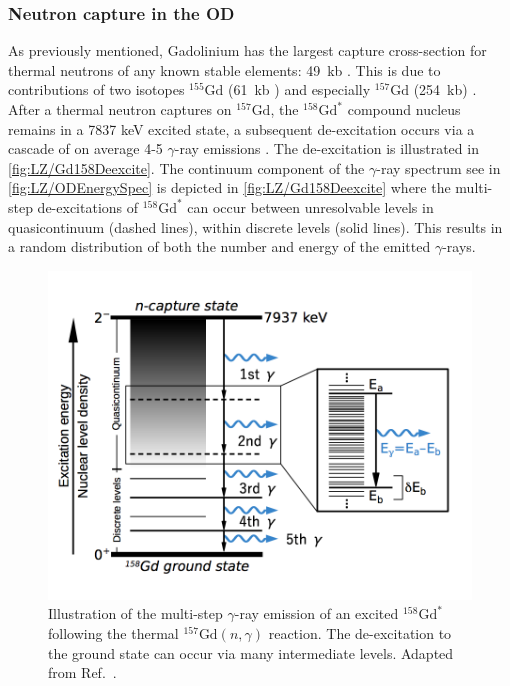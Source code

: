 \subsubsection{Neutron capture in the OD}\label{sec:LZ/NeutronCapture}
As previously mentioned, Gadolinium has the largest capture cross-section for thermal neutrons of any known stable elements: 49~kb \cite{Hagiwara:2018kmr}. This is due to contributions of two isotopes $^{155}\text{Gd}$ (61~kb ) and especially $^{157}\text{Gd}$ (254~kb) \cite{Hagiwara:2018kmr}. After a thermal neutron captures on $^{157}\text{Gd}$, the $^{158}\text{Gd}^*$ compound nucleus remains in a 7837 keV excited state, a subsequent de-excitation occurs via a cascade of on average 4-5 $\gamma$-ray emissions \cite{Hagiwara:2018kmr}. The de-excitation is illustrated in \autoref{fig:LZ/Gd158Deexcite}. The continuum component of the $\gamma$-ray spectrum see in \autoref{fig:LZ/ODEnergySpec} is depicted in \autoref{fig:LZ/Gd158Deexcite} where the multi-step de-excitations of $^{158}\text{Gd}^*$ can occur between unresolvable levels in quasicontinuum (dashed lines), within discrete levels (solid lines). This results in a random distribution of both the number and energy of the emitted $\gamma$-rays. 

\begin{figure}[!ht]
    \centering
    \includegraphics[width=0.8\linewidth]{figures/LZ/ContinuumEmission2.png}
    \caption{Illustration of the multi-step $\gamma$-ray emission of an excited $^{158}\text{Gd}^*$ following the thermal $^{157}\text{Gd}(n,\gamma)$ reaction. The de-excitation to the ground state can occur via many intermediate levels. Adapted from Ref.~\cite{Hagiwara:2018kmr}.}
    \label{fig:LZ/Gd158Deexcite}
\end{figure}


